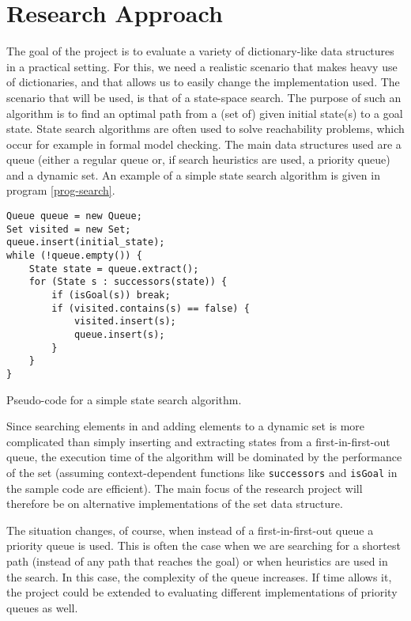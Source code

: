 \documentclass{acm_proc_article-sp}
\begin{document}
\section{Research Approach}


The goal of the project is to evaluate a variety of dictionary-like data structures in a practical setting. For this, we need a realistic scenario that makes heavy use of dictionaries, and that allows us to easily change the implementation used. The scenario that will be used, is that of a state-space search. The purpose of such an algorithm is to find an optimal path from a (set of) given initial state(s) to a goal state. State search algorithms are often used to solve reachability problems, which occur for example in formal model checking. The main data structures used are a queue (either a regular queue or, if search heuristics are used, a priority queue) and a dynamic set. An example of a simple state search algorithm is given in program \ref{prog-search}.

\begin{program}
\begin{verbatim}
Queue queue = new Queue;
Set visited = new Set;
queue.insert(initial_state);
while (!queue.empty()) {
    State state = queue.extract();
    for (State s : successors(state)) {
        if (isGoal(s)) break;
        if (visited.contains(s) == false) {
            visited.insert(s);
            queue.insert(s);
        }
    }
}
\end{verbatim}
\caption{Pseudo-code for a simple state search algorithm.}
\label{prog-search}
\end{program}

Since searching elements in and adding elements to a dynamic set is more complicated than simply inserting and extracting states from a first-in-first-out queue, the execution time of the algorithm will be dominated by the performance of the set (assuming context-dependent functions like \verb#successors# and \verb#isGoal# in the sample code are efficient). The main focus of the research project will therefore be on alternative implementations of the set data structure.

The situation changes, of course, when instead of a first-in-first-out queue a priority queue is used. This is often the case when we are searching for a shortest path (instead of any path that reaches the goal) or when heuristics are used in the search. In this case, the complexity of the queue increases. If time allows it, the project could be extended to evaluating different implementations of priority queues as well.
\end{document}
